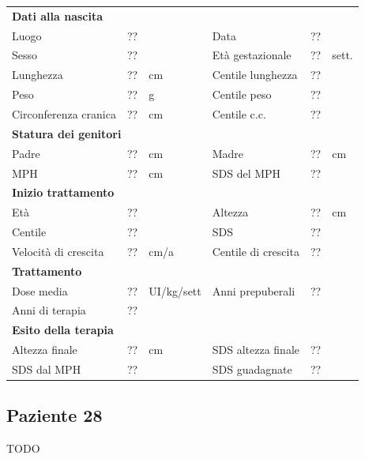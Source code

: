 \begin{table}[!h]
\begin{tabular}{lrllrl}
\toprule
\multicolumn{6}{l}{\textbf{Dati alla nascita}}\\
Luogo 		& \multicolumn{2}{l}{??} 	& Data 					& \multicolumn{2}{l}{??} 	\\
Sesso 		& \multicolumn{2}{l}{??} 	& Età gestazionale 		& ?? 		& sett.\\
Lunghezza 	& ?? 		& cm 				& Centile lunghezza		& ?? 		\\
Peso 		& ?? 		& g					& Centile peso			& ?? 		\\
Circonferenza cranica	& ?? 		& cm 	& Centile c.c.			& ?? \\
\midrule
\multicolumn{6}{l}{\textbf{Statura dei genitori}}\\
Padre 		& ?? & cm 	& Madre 				& ?? & cm \\
MPH 		& ?? & cm 	& SDS del MPH 			& ??\\
\midrule
\multicolumn{6}{l}{\textbf{Inizio trattamento}} \\
Età	& ?? & 		& Altezza 				& ?? & cm  \\
Centile & ?? 	 &		& SDS		& ?? \\
Velocità di crescita & ?? & cm/a	& Centile di crescita & ??\\
\midrule
\multicolumn{6}{l}{\textbf{Trattamento}} \\
Dose media		& ?? & UI/kg/sett & Anni prepuberali & ??\\
Anni di terapia & ??\\
\midrule
\multicolumn{6}{l}{\textbf{Esito della terapia}} \\
Altezza finale			& ?? & cm 	& SDS altezza finale		& ??\\
SDS dal MPH				& ?? &		& SDS guadagnate 			& ??\\
\bottomrule
\end{tabular}
\end{table}
\clearpage


\subsection*{Paziente 28}

TODO

